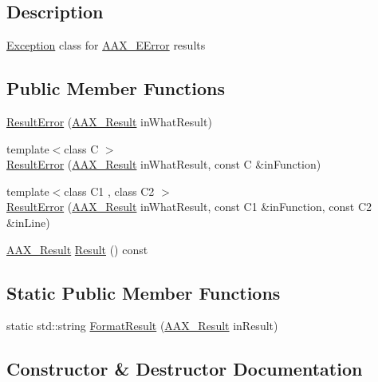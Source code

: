 \subsection{Description}
\hyperlink{a00320}{Exception} class for \hyperlink{a00207_a5f8c7439f3a706c4f8315a9609811937}{A\+A\+X\+\_\+\+E\+Error} results \subsection*{Public Member Functions}
\begin{DoxyCompactItemize}
\item 
\hyperlink{a00147_ad96a8e3b025441353ffd2eb4f25f9126}{Result\+Error} (\hyperlink{a00149_a4d8f69a697df7f70c3a8e9b8ee130d2f}{A\+A\+X\+\_\+\+Result} in\+What\+Result)
\item 
{\footnotesize template$<$class C $>$ }\\\hyperlink{a00147_adb645fa763b880387217fda5fb08e9ce}{Result\+Error} (\hyperlink{a00149_a4d8f69a697df7f70c3a8e9b8ee130d2f}{A\+A\+X\+\_\+\+Result} in\+What\+Result, const C \&in\+Function)
\item 
{\footnotesize template$<$class C1 , class C2 $>$ }\\\hyperlink{a00147_a512d5c7f7c7fdea31d86ef0696768a37}{Result\+Error} (\hyperlink{a00149_a4d8f69a697df7f70c3a8e9b8ee130d2f}{A\+A\+X\+\_\+\+Result} in\+What\+Result, const C1 \&in\+Function, const C2 \&in\+Line)
\item 
\hyperlink{a00149_a4d8f69a697df7f70c3a8e9b8ee130d2f}{A\+A\+X\+\_\+\+Result} \hyperlink{a00147_ab62fbe044cceea7c341ae4dfafb036cc}{Result} () const 
\end{DoxyCompactItemize}
\subsection*{Static Public Member Functions}
\begin{DoxyCompactItemize}
\item 
static std\+::string \hyperlink{a00147_a55c2ce6a7122bee29558dc16bd860067}{Format\+Result} (\hyperlink{a00149_a4d8f69a697df7f70c3a8e9b8ee130d2f}{A\+A\+X\+\_\+\+Result} in\+Result)
\end{DoxyCompactItemize}


\subsection{Constructor \& Destructor Documentation}
\hypertarget{a00147_ad96a8e3b025441353ffd2eb4f25f9126}{}
